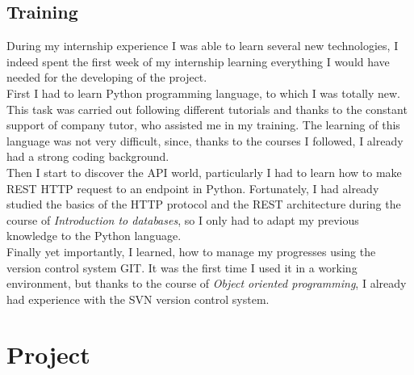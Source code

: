 \documentclass[12pt, a4paper, oneside]{article}
\begin{document}
\subsection{Training}
During my internship experience I was able to learn several new technologies, I indeed spent the first week of my internship learning everything I would have needed for the developing of the project.\\
First I had to learn Python programming language, to which I was totally new. This task was carried out following different tutorials and thanks to the constant support of company tutor, who assisted me in
my training. The learning of this language was not very difficult, since, thanks to the courses I followed, I already had a strong coding background.\\
Then I start to discover the API world, particularly I had to learn how to make REST HTTP request to an endpoint in Python. Fortunately, I had already studied the basics of the HTTP protocol and the REST architecture
during the course of \emph{Introduction to databases}, so I only had to adapt my previous knowledge to the Python language.\\
Finally yet importantly, I learned, how to manage my progresses using the version control system GIT. It was the first time I used it in a working environment, but thanks to the course of \emph{Object oriented programming},
I already had experience with the SVN version control system.

\newpage
\section{Project}
\end{document}
